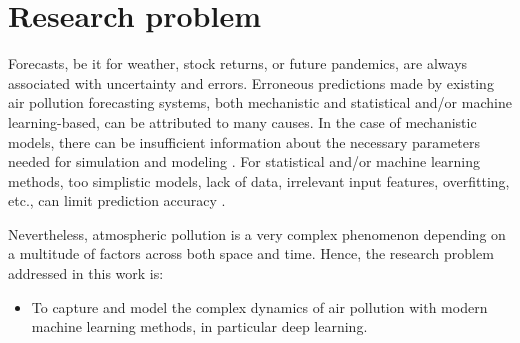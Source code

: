 
\section{Research problem}

Forecasts, be it for weather, stock returns, or future pandemics, are always associated with uncertainty and errors. Erroneous predictions made by existing air pollution forecasting systems, both mechanistic and statistical and/or machine learning-based, can be attributed to many causes. 
In the case of mechanistic models, there can be insufficient information about the necessary parameters needed for simulation and modeling \cite{atmos7020015}. For statistical and/or machine learning methods, too simplistic models, lack of data, irrelevant input features, overfitting, etc., can limit prediction accuracy \cite{atmos7020015}. 

Nevertheless, atmospheric pollution is a very complex phenomenon depending on a multitude of factors across both space and time. Hence, the research problem addressed in this work is:

\begin{itemize}
\item To capture and model the complex dynamics of air pollution with modern machine learning methods, in particular deep learning.
\end{itemize}




